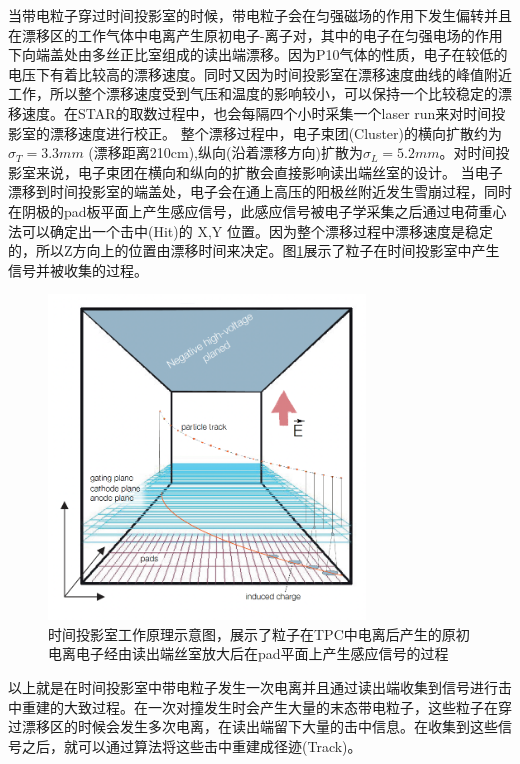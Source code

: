 当带电粒子穿过时间投影室的时候，带电粒子会在匀强磁场的作用下发生偏转并且在漂移区的工作气体中电离产生原初电子-离子对，其中的电子在匀强电场的作用下向端盖处由多丝正比室组成的读出端漂移。因为P10气体的性质，电子在较低的电压下有着比较高的漂移速度。同时又因为时间投影室在漂移速度曲线的峰值附近工作，所以整个漂移速度受到气压和温度的影响较小，可以保持一个比较稳定的漂移速度。在STAR的取数过程中，也会每隔四个小时采集一个laser run来对时间投影室的漂移速度进行校正。
整个漂移过程中，电子束团(Cluster)的横向扩散约为 $\sigma_{T} = 3.3mm$ (漂移距离210cm),纵向(沿着漂移方向)扩散为$\sigma_{L} = 5.2mm$。对时间投影室来说，电子束团在横向和纵向的扩散会直接影响读出端丝室的设计。
当电子漂移到时间投影室的端盖处，电子会在通上高压的阳极丝附近发生雪崩过程，同时在阴极的pad板平面上产生感应信号，此感应信号被电子学采集之后通过电荷重心法可以确定出一个击中(Hit)的 X,Y 位置。因为整个漂移过程中漂移速度是稳定的，所以Z方向上的位置由漂移时间来决定。图\ref{fig:HowTPCWrok}展示了粒子在时间投影室中产生信号并被收集的过程。

\begin{figure}[htb]
    \begin{center}
    \includegraphics[width=0.75\textwidth,clip]{figures/Chapter2/HowTPCWork.png}
    \end{center}
    \caption[时间投影室工作原理示意图]{时间投影室工作原理示意图，展示了粒子在TPC中电离后产生的原初电离电子经由读出端丝室放大后在pad平面上产生感应信号的过程}
    \label{fig:HowTPCWrok}
\end{figure}

以上就是在时间投影室中带电粒子发生一次电离并且通过读出端收集到信号进行击中重建的大致过程。在一次对撞发生时会产生大量的末态带电粒子，这些粒子在穿过漂移区的时候会发生多次电离，在读出端留下大量的击中信息。在收集到这些信号之后，就可以通过算法将这些击中重建成径迹(Track)。


